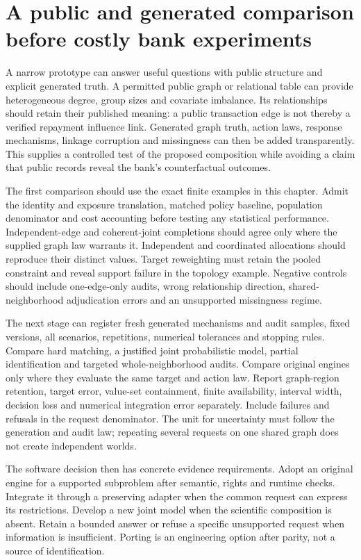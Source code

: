 \section{A public and generated comparison before costly bank experiments}
\label{exec17:s7-prototype}

A narrow prototype can answer useful questions with public structure and
explicit generated truth. A permitted public graph or relational table can
provide heterogeneous degree, group sizes and covariate imbalance. Its
relationships should retain their published meaning: a public transaction
edge is not thereby a verified repayment influence link. Generated graph
truth, action laws, response mechanisms, linkage corruption and missingness
can then be added transparently. This supplies a controlled test of the
proposed composition while avoiding a claim that public records reveal the
bank's counterfactual outcomes.~\citep{exec17_s7_design}

The first comparison should use the exact finite examples in this chapter.
Admit the identity and exposure translation, matched policy baseline,
population denominator and cost accounting before testing any statistical
performance. Independent-edge and coherent-joint completions should agree
only where the supplied graph law warrants it. Independent and coordinated
allocations should reproduce their distinct values. Target reweighting must
retain the pooled constraint and reveal support failure in the topology
example. Negative controls should include one-edge-only audits, wrong
relationship direction, shared-neighborhood adjudication errors and an
unsupported missingness regime.

The next stage can register fresh generated mechanisms and audit samples,
fixed versions, all scenarios, repetitions, numerical tolerances and stopping
rules. Compare hard matching, a justified joint probabilistic model, partial
identification and targeted whole-neighborhood audits. Compare original
engines only where they evaluate the same target and action law. Report
graph-region retention, target error, value-set containment, finite
availability, interval width, decision loss and numerical integration error
separately. Include failures and refusals in the request denominator. The
unit for uncertainty must follow the generation and audit law; repeating
several requests on one shared graph does not create independent worlds.

The software decision then has concrete evidence requirements. Adopt an
original engine for a supported subproblem after semantic, rights and
runtime checks. Integrate it through a preserving adapter when the common
request can express its restrictions. Develop a new joint model when the
scientific composition is absent. Retain a bounded answer or refuse a
specific unsupported request when information is insufficient. Porting is
an engineering option after parity, not a source of identification.

